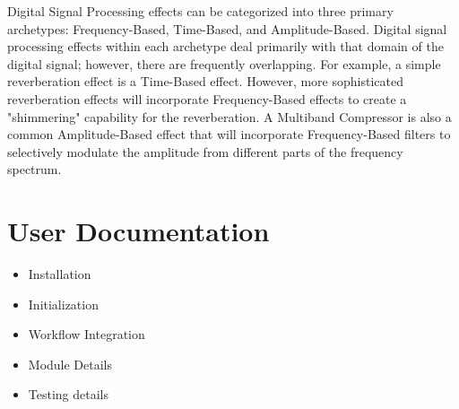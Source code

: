 \documentclass[a4paper,12pt]{report}
\begin{document}
Digital Signal Processing effects can be categorized into three primary archetypes: Frequency-Based, Time-Based, and Amplitude-Based. Digital signal processing effects within each archetype deal primarily with that domain of the digital signal; however, there are frequently overlapping. For example, a simple reverberation effect is a Time-Based effect. However, more sophisticated reverberation effects will incorporate Frequency-Based effects to create a "shimmering" capability for the reverberation. A Multiband Compressor is also a common Amplitude-Based effect that will incorporate Frequency-Based filters to selectively modulate the amplitude from different parts of the frequency spectrum.




\chapter{User Documentation}


\begin{itemize}
    \item Installation
    \item Initialization
    \item Workflow Integration
    \item Module Details
    \item Testing details
\end{itemize}

\end{document}
